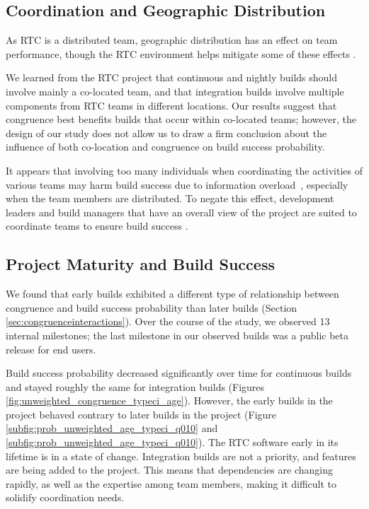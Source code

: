 \subsection{Coordination and Geographic Distribution}
As RTC is a distributed team, geographic distribution has an effect on team performance, though the RTC environment helps mitigate some of these effects \cite{Nguyen:2008Distance}.

We learned from the RTC project that continuous and nightly builds should involve mainly a co-located team, and that integration builds involve multiple components from RTC teams in different locations. Our results suggest that congruence best benefits builds that occur within co-located teams; however, the design of our study does not allow us to draw a firm conclusion about the influence of both co-location and congruence on build success probability.

It appears that involving too many individuals when coordinating the activities of various teams may harm build success due to information overload~\cite{damian:icgse:2007}, especially when the team members are distributed. To negate this effect, development leaders and build managers that have an overall view of the project are suited to coordinate teams to ensure build success \cite{hinds:cscw:2006}.


\subsection{Project Maturity and Build Success}
We found that early builds exhibited a different type of relationship between congruence and build success probability than later builds (Section \ref{sec:congruenceinteractions}). Over the course of the study, we observed 13 internal milestones; the last milestone in our observed builds was a public beta release for end users.

Build success probability decreased significantly over time for continuous builds and stayed roughly the same for integration builds (Figures \ref{fig:unweighted_congruence_typeci_age}).
However, the early builds in the project behaved contrary to later builds in the project (Figure \ref{subfig:prob_unweighted_age_typeci_q010} and \ref{subfig:prob_unweighted_age_typeci_q010}). The RTC software early in its lifetime is in a state of change. Integration builds are not a priority, and features are being added to the project. This means that dependencies are changing rapidly, as well as the expertise among team members, making it difficult to solidify coordination needs.

